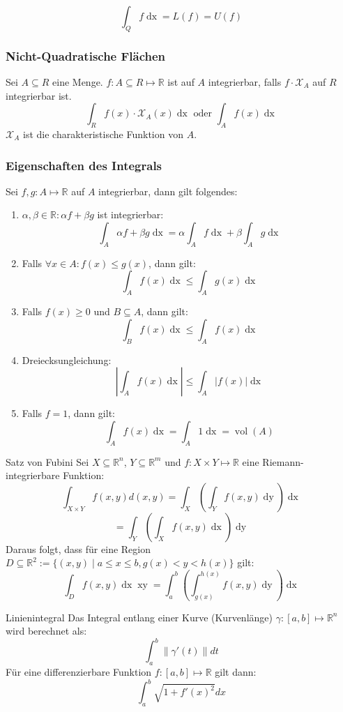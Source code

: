 \documentclass[a4paper,10pt]{article}
\def\R{\mathbb{R}}
\def\X{\mathcal{X}}
\def\dx{\mathop{dx}}
\def\dy{\mathop{dy}}
\DeclareMathOperator{\vol}{\text{vol}}
\begin{document}
$$ \int_Q f \dx = L(f) = U(f) $$

\subsubsection*{Nicht-Quadratische Flächen}
Sei \(A \subseteq R\) eine Menge. \(f : A \subseteq R \mapsto \R\) ist auf \(A\) integrierbar, falls \(f \cdot \X_A\) auf \(R\) integrierbar ist. 
\[\int_R f(x) \cdot \X_A(x) \mathop{dx} \text{ oder } \int_A f(x) \mathop{dx}\]
\(\X_A\) ist die charakteristische Funktion von \(A\).

\subsubsection*{Eigenschaften des Integrals}
Sei \(f,g : A \mapsto \R\) auf \(A\) integrierbar, dann gilt folgendes:
\begin{enumerate}
  \item \(\alpha, \beta \in \R: \alpha f + \beta g\) ist integrierbar:
  \[\int_A \alpha f + \beta g \mathop{dx} = \alpha \int_A f \mathop{dx} + \beta \int_A g \mathop{dx}\]
  \item Falls \(\forall x \in A: f(x) \le g(x)\), dann gilt:
  \[\int_A f(x) \mathop{dx} \le \int_A g(x) \mathop{dx}\]
  \item Falls \(f(x) \ge 0\) und \(B \subseteq A\), dann gilt:
  \[\int_B f(x) \mathop{dx} \le \int_A f(x) \mathop{dx}\]
  \item Dreiecksungleichung:
    \[\left| \int_A f(x) \mathop{dx}\right| \le \int_A \left|f(x)\right| \mathop{dx}\]
  \item Falls \(f = 1\), dann gilt:
  \[\int_A f(x) \mathop{dx} = \int_A 1 \mathop{dx} = \vol(A)\]
\end{enumerate}


\begin{mainbox}{Satz von Fubini}
  Sei $X \subseteq \R^n$, $Y \subseteq \R^m$ und $f: X \times Y \mapsto \R$ eine Riemann-integrierbare Funktion:
  $$\int_{X \times Y} f(x, y) d(x, y) = \int_X \left( \int_Y f(x,y) \dy \right) \dx$$
  $$= \int_Y \left( \int_X f(x,y) \dx \right) \dy$$
  Daraus folgt, dass für eine Region \(D \subseteq \R^2 := \{\left(x,y\right) \mid a \le x \le b, g(x) < y < h(x)\}\) gilt:
  \[\int_D f(x,y)\mathop{dx} \mathop{xy} = \int_a^b \left(\int_{g(x)}^{h(x)} f(x,y) \mathop{dy}\right)\mathop{dx}\]
\end{mainbox}

\begin{subbox}{Linienintegral}
  Das Integral entlang einer Kurve (Kurvenlänge) $\gamma: [a, b] \mapsto \R^n$ wird berechnet als:
  $$\int_a^b \lVert \gamma'(t) \rVert dt$$
  Für eine differenzierbare Funktion $f: [a, b] \mapsto \R$ gilt dann:
  $$\int_a^b \sqrt{1 + f'(x)^2} dx$$
\end{subbox}
\end{document}
